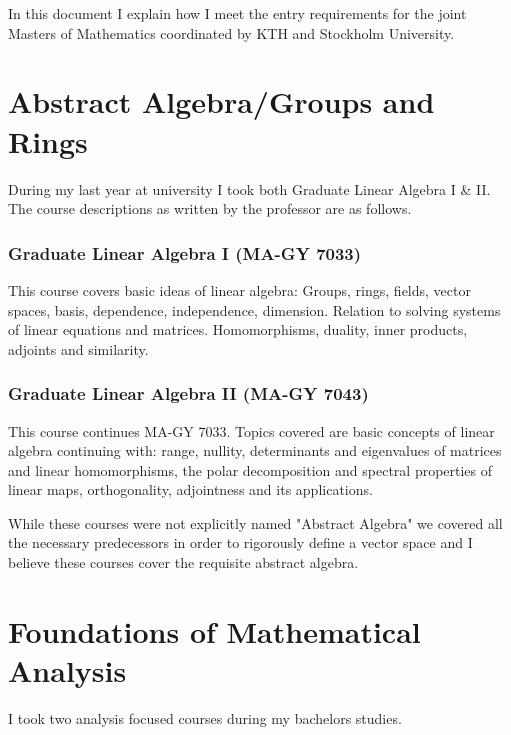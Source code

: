 \documentclass[11pt]{article}
\begin{document}
In this document I explain how I meet the entry requirements for the joint Masters of Mathematics coordinated by KTH and Stockholm University.

\section*{Abstract Algebra/Groups and Rings}

During my last year at university I took both Graduate Linear Algebra I \& II. The course descriptions as written by the professor are as follows.
\subsubsection*{Graduate Linear Algebra I (MA-GY 7033)}
\begin{displayquote}
This course covers basic ideas of linear algebra: Groups, rings, fields, vector spaces, basis, dependence, independence, dimension. Relation to solving systems of linear equations and matrices. Homomorphisms, duality, inner products, adjoints and similarity.
\end{displayquote}

\subsubsection*{Graduate Linear Algebra II (MA-GY 7043)}
\begin{displayquote}
This course continues MA-GY 7033. Topics covered are basic concepts of linear algebra continuing with: range, nullity, determinants and eigenvalues of matrices and linear homomorphisms, the polar decomposition and spectral properties of linear maps, orthogonality, adjointness and its applications.
\end{displayquote}

While these courses were not explicitly named "Abstract Algebra" we covered all the necessary predecessors in order to rigorously define a vector space and I believe these courses cover the requisite abstract algebra.

\section*{Foundations of Mathematical Analysis}

I took two analysis focused courses during my bachelors studies.
\end{document}
